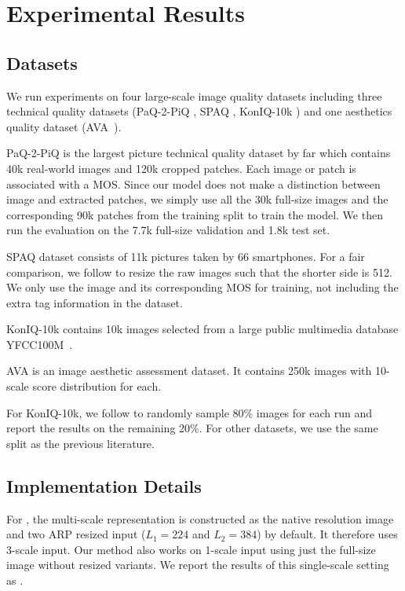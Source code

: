 
\section{Experimental Results}

\subsection{Datasets}
\label{sec:datasets}
\noindent We run experiments on four large-scale image quality datasets including three technical quality datasets (PaQ-2-PiQ \cite{ying2020patches}, SPAQ \cite{fang2020perceptual},  KonIQ-10k \cite{hosu2020koniq}) and one aesthetics quality dataset (AVA~\cite{murray2012ava}).

PaQ-2-PiQ is the largest picture technical quality dataset by far which contains 40k real-world images and 120k cropped patches. Each image or patch is associated with a MOS. Since our model does not make a distinction between image and extracted patches, we simply use all the 30k full-size images and the corresponding 90k patches from the training split to train the model. We then run the evaluation on the 7.7k full-size validation and 1.8k test set.

SPAQ dataset consists of 11k pictures taken by 66 smartphones. For a fair comparison, we follow \cite{fang2020perceptual} to resize the raw images such that the shorter side is 512. We only use the image and its corresponding MOS for training, not including the extra tag information in the dataset.

KonIQ-10k contains 10k images selected from a large public multimedia database YFCC100M~\cite{thomee2016yfcc100m}.

AVA is an image aesthetic assessment dataset. It contains 250k images with 10-scale score distribution for each.

For KonIQ-10k, we follow \cite{zhu2020metaiqa, su2020blindly} to randomly sample 80\% images for each run and report the results on the remaining 20\%. For other datasets, we use the same split as the previous literature.

\subsection{Implementation Details}
\noindent For \ours, the multi-scale representation is constructed as the native resolution image and two ARP resized input ($L_1=224$ and $L_2=384$) by default. It therefore uses 3-scale input. Our method also works on 1-scale input using just the full-size image without resized variants. We report the results of this single-scale setting as \fullours.

